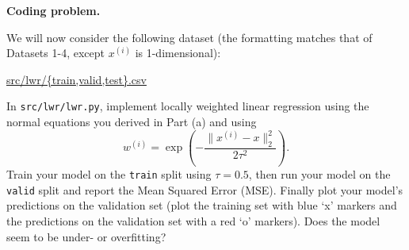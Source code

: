 \newpage

\item {} \textbf{Coding problem.}

We will now consider the following dataset (the
formatting matches that of Datasets 1-4, except $x^{(i)}$ is 1-dimensional):
\begin{center}
	\url{src/lwr/{train,valid,test}.csv}	
\end{center}

In \texttt{src/lwr/lwr.py}, implement locally weighted linear regression
using the normal equations you derived in Part (a) and using
%
\begin{equation*}
	w^{(i)} = \exp\left(-\frac{\|x^{(i)} - x\|_2^2}{2\tau^2}\right).
\end{equation*}
%
Train your model on the \texttt{train} split using $\tau = 0.5$, then run your
model on the \texttt{valid} split and report the Mean Squared Error (MSE).
Finally plot your model's predictions on the validation set (plot the
training set with blue `x' markers and the predictions on the
validation set with a red `o' markers). Does the model seem to be under-
or overfitting?
